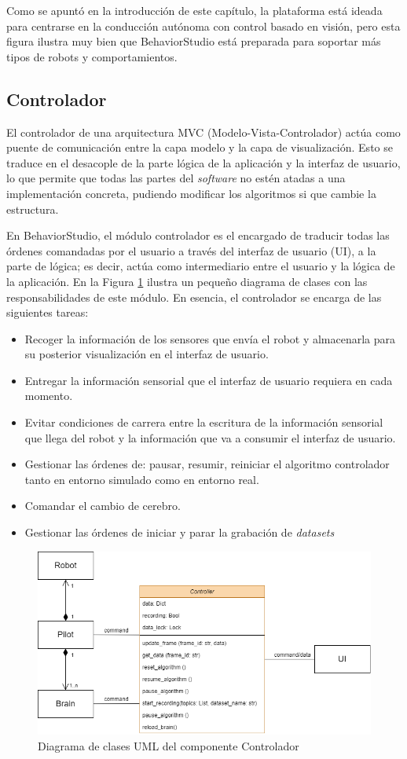 Como se apuntó en la introducción de este capítulo, la plataforma está ideada para centrarse en la conducción autónoma con control basado en visión, pero esta figura ilustra muy bien que BehaviorStudio está preparada para soportar más tipos de robots y comportamientos.

\subsection{Controlador}
\label{sec:controller}

El controlador de una arquitectura MVC (Modelo-Vista-Controlador) actúa como puente de comunicación entre la capa modelo y la capa de visualización. Esto se traduce en el desacople de la parte lógica de la aplicación y la interfaz de usuario, lo que permite que todas las partes del \textit{software} no estén atadas a una implementación concreta, pudiendo modificar los algoritmos si que cambie la estructura. 

En BehaviorStudio, el módulo controlador es el encargado de traducir todas las órdenes comandadas por el usuario a través del interfaz de usuario (UI), a la parte de lógica; es decir, actúa como intermediario entre el usuario y la lógica de la aplicación. En la Figura \ref{fig:controluml} ilustra un pequeño diagrama de clases con las responsabilidades de este módulo. En esencia, el controlador se encarga de las siguientes tareas:

\begin{itemize}
    \item Recoger la información de los sensores que envía el robot y almacenarla para su posterior visualización en el interfaz de usuario.
    \item Entregar la información sensorial que el interfaz de usuario requiera en cada momento.
    \item Evitar condiciones de carrera entre la escritura de la información sensorial que llega del robot y la información que va a consumir el interfaz de usuario.
    \item Gestionar las órdenes de: pausar, resumir, reiniciar el algoritmo controlador tanto en entorno simulado como en entorno real.
    \item Comandar el cambio de cerebro.
    \item Gestionar las órdenes de iniciar y parar la grabación de \textit{datasets}
\end{itemize}

\begin{figure}
  \centering
  \includegraphics[width=.7\linewidth]{img/controlleruml}
  \caption{Diagrama de clases UML del componente Controlador}
  \label{fig:controluml}
\end{figure}

